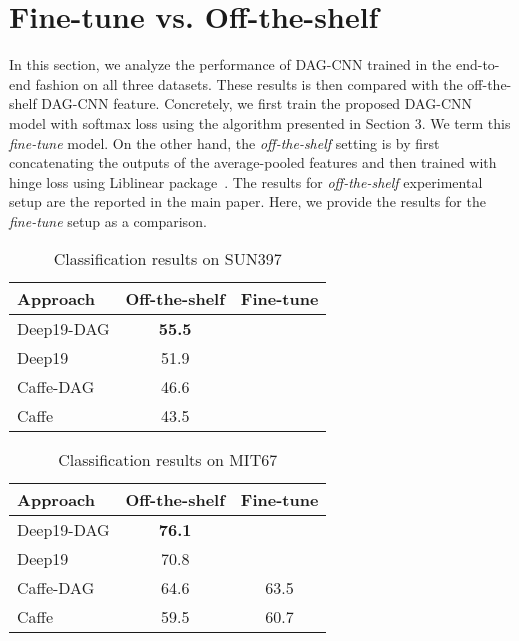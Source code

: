 \documentclass[10pt,twocolumn,letterpaper]{article}
\begin{document}
\section{Fine-tune vs. Off-the-shelf}

In this section, we analyze the performance of DAG-CNN trained in the end-to-end fashion on all three datasets. These results is then compared with the off-the-shelf DAG-CNN feature. Concretely, we first train the proposed DAG-CNN model with softmax loss using the algorithm presented in Section 3. We term this \textit{fine-tune} model. On the other hand, the \textit{off-the-shelf} setting is by first concatenating the outputs of the average-pooled features and then trained with hinge loss using Liblinear package~\cite{liblinear}. The results for \textit{off-the-shelf} experimental setup are the reported in the main paper. Here, we provide the results for the \textit{fine-tune} setup as a comparison. 


\begin{table}[htbp]
\begin{center}
\begin{tabular}{|l|c|c|}
\hline
Approach & Off-the-shelf &  Fine-tune\\
\hline
Deep19-DAG & \textbf{55.5} &  \\
Deep19~\cite{veryDeep} & 51.9 &  \\
Caffe-DAG & 46.6	& \\
Caffe~\cite{Caffe} & 43.5 &  \\ \hline

\hline
\end{tabular}
\end{center}
\caption{Classification results on SUN397}
\label{table:SUN397}
\end{table}



\begin{table}[htbp]
\begin{center}
\begin{tabular}{|l|c|c|}
\hline
Approach & Off-the-shelf &  Fine-tune\\
\hline
Deep19-DAG & \textbf{76.1} &  \\
Deep19~\cite{veryDeep} & 70.8 &  \\
Caffe-DAG & 64.6	& 63.5\\
Caffe~\cite{Caffe} & 59.5 & 60.7 \\ \hline

\hline
\end{tabular}
\end{center}
\caption{Classification results on MIT67}
\label{table:MIT67}
\end{table}
\end{document}
